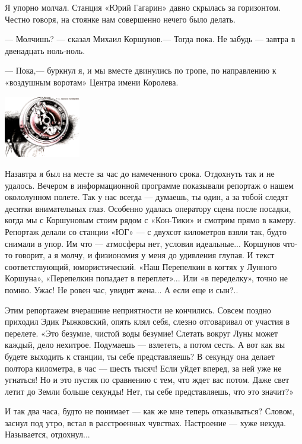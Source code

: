 \documentclass[11pt,a4paper,oneside]{article}
\begin{document}
Я упорно молчал. Станция «Юрий Гагарин» давно скрылась за горизонтом. Честно говоря, на стоянке нам совершенно нечего было делать.

— Молчишь? — сказал Михаил Коршунов.— Тогда пока. Не забудь — завтра в двенадцать ноль-ноль.

— Пока,— буркнул я, и мы вместе двинулись по тропе, по направлению к «воздушным воротам» Центра имени Королева.

\includegraphics[width=0.25\textwidth]{start}

Назавтра я был на месте за час до намеченного срока. Отдохнуть так и не удалось. Вечером в информационной программе показывали репортаж о нашем окололунном полете. Так у нас всегда — думаешь, ты один, а за тобой следят десятки внимательных глаз. Особенно удалась оператору сцена после посадки, когда мы с Коршуновым стоим рядом с «Кон-Тики» и смотрим прямо в камеру. Репортаж делали со станции «ЮГ» — с двухсот километров взяли так, будто снимали в упор. Им что — атмосферы нет, условия идеальные... Коршунов что-то говорит, а я молчу, и физиономия у меня до удивления глупая. И текст соответствующий, юмористический. «Наш Перепелкин в когтях у Лунного Коршуна», «Перепелкин попадает в переплет»... Или «в переделку», точно не помню. Ужас! Не ровен час, увидит жена... А если еще и сын?..

Этим репортажем вчерашние неприятности не кончились. Совсем поздно приходил Эдик Рыжковский, опять клял себя, слезно отговаривал от участия в перелете. «Это безумие, чистой воды безумие! Слетать вокруг Луны может каждый, дело нехитрое. Подумаешь — взлететь, а потом сесть. А вот как вы будете выходить к станции, ты себе представляешь? В секунду она делает полтора километра, в час — шесть тысяч! Если уйдет вперед, за ней уже не угнаться! Но и это пустяк по сравнению с тем, что ждет вас потом. Даже свет летит до Земли больше секунды! Нет, ты себе представляешь, что это значит?»

И так два часа, будто не понимает — как же мне теперь отказываться? Словом, заснул под утро, встал в расстроенных чувствах. Настроение — хуже некуда. Называется, отдохнул...
\end{document}
